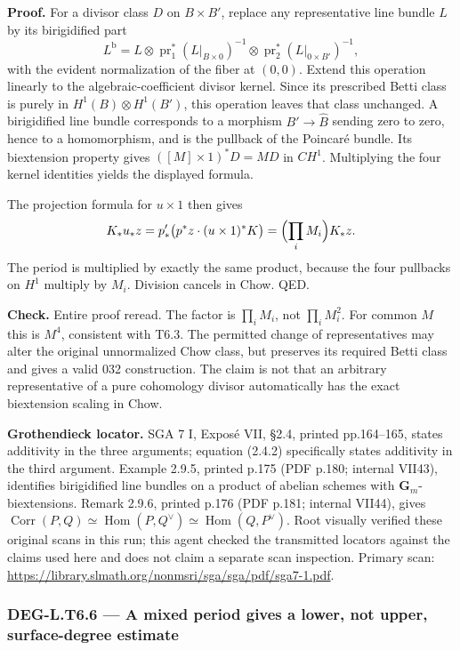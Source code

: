 \documentclass[11pt,a4paper]{article}
\theoremstyle{definition}
\begin{document}
\textbf{Proof.} For a divisor class \(D\) on \(B\times B'\), replace any representative line bundle \(L\) by its birigidified part \[
L^{\mathrm b}=L\otimes\operatorname{pr}_1^*(L|_{B\times0})^{-1}
\otimes\operatorname{pr}_2^*(L|_{0\times B'})^{-1},
\] with the evident normalization of the fiber at \((0,0)\). Extend this operation linearly to the algebraic-coefficient divisor kernel. Since its prescribed Betti class is purely in \(H^1(B)\otimes H^1(B')\), this operation leaves that class unchanged. A birigidified line bundle corresponds to a morphism \(B'\to\widehat B\) sending zero to zero, hence to a homomorphism, and is the pullback of the Poincaré bundle. Its biextension property gives \(([M]\times1)^*D=M D\) in \(CH^1\). Multiplying the four kernel identities yields the displayed formula.

The projection formula for \(u\times1\) then gives \[
K_*u_*z=p'_*\bigl(p^*z\cdot(u\times1)^*K\bigr)
=\Bigl(\prod_iM_i\Bigr)K_*z.
\] The period is multiplied by exactly the same product, because the four pullbacks on \(H^1\) multiply by \(M_i\). Division cancels in Chow. QED.

\textbf{Check.} Entire proof reread. The factor is \(\prod_iM_i\), not \(\prod_iM_i^2\). For common \(M\) this is \(M^4\), consistent with T6.3. The permitted change of representatives may alter the original unnormalized Chow class, but preserves its required Betti class and gives a valid 032 construction. The claim is not that an arbitrary representative of a pure cohomology divisor automatically has the exact biextension scaling in Chow.

\textbf{Grothendieck locator.} SGA 7 I, Exposé VII, §2.4, printed pp.164--165, states additivity in the three arguments; equation (2.4.2) specifically states additivity in the third argument. Example 2.9.5, printed p.175 (PDF p.180; internal VII43), identifies birigidified line bundles on a product of abelian schemes with \(\mathbf G_m\)-biextensions. Remark 2.9.6, printed p.176 (PDF p.181; internal VII44), gives \(\operatorname{Corr}(P,Q)\simeq\operatorname{Hom}(P,Q^\vee)\simeq\operatorname{Hom}(Q,P^\vee)\). Root visually verified these original scans in this run; this agent checked the transmitted locators against the claims used here and does not claim a separate scan inspection. Primary scan: \url{https://library.slmath.org/nonmsri/sga/sga/pdf/sga7-1.pdf}.

\subsubsection{DEG-L.T6.6 --- A mixed period gives a lower, not upper, surface-degree estimate}\label{DEG-L.T6.6}
\end{document}
